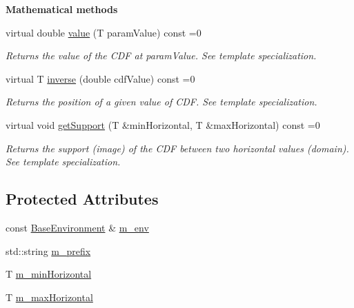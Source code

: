\begin{Indent}{\bf Mathematical methods}\par
\begin{DoxyCompactItemize}
\item 
virtual double \hyperlink{class_q_u_e_s_o_1_1_base_scalar_cdf_a887af6d62eb04f2bf3b58c12e586f20b}{value} (T param\-Value) const =0
\begin{DoxyCompactList}\small\item\em Returns the value of the C\-D\-F at {\ttfamily param\-Value}. See template specialization. \end{DoxyCompactList}\item 
virtual T \hyperlink{class_q_u_e_s_o_1_1_base_scalar_cdf_a3e1778c76a557716e74b5fc11604dd75}{inverse} (double cdf\-Value) const =0
\begin{DoxyCompactList}\small\item\em Returns the position of a given value of C\-D\-F. See template specialization. \end{DoxyCompactList}\item 
virtual void \hyperlink{class_q_u_e_s_o_1_1_base_scalar_cdf_a9684b285f88be8c2bafe4d2abd8a7447}{get\-Support} (T \&min\-Horizontal, T \&max\-Horizontal) const =0
\begin{DoxyCompactList}\small\item\em Returns the support (image) of the C\-D\-F between two horizontal values (domain). See template specialization. \end{DoxyCompactList}\end{DoxyCompactItemize}
\end{Indent}
\subsection*{Protected Attributes}
\begin{DoxyCompactItemize}
\item 
const \hyperlink{class_q_u_e_s_o_1_1_base_environment}{Base\-Environment} \& \hyperlink{class_q_u_e_s_o_1_1_base_scalar_cdf_a3caa986ae1ccef96a28b0365fb88c86c}{m\-\_\-env}
\item 
std\-::string \hyperlink{class_q_u_e_s_o_1_1_base_scalar_cdf_a66c2a1bcf0ac517013e7857c3533a187}{m\-\_\-prefix}
\item 
T \hyperlink{class_q_u_e_s_o_1_1_base_scalar_cdf_ab54be9623cddb0671db458d05d63f0a7}{m\-\_\-min\-Horizontal}
\item 
T \hyperlink{class_q_u_e_s_o_1_1_base_scalar_cdf_a33beb9b7e610a4fe1458080593982d2e}{m\-\_\-max\-Horizontal}
\end{DoxyCompactItemize}
